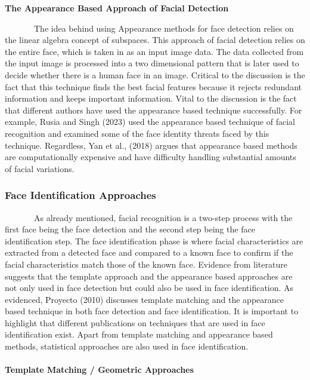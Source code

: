 \documentclass[
  12pt,
]{article}
\begin{document}
\textbf{The Appearance Based Approach of Facial Detection}\\
\vspace{-2.8em}

~~~~~~~The idea behind using Appearance methods for face detection
relies on the linear algebra concept of subspaces. This approach of
facial detection relies on the entire face, which is taken in as an
input image data. The data collected from the input image is processed
into a two dimensional pattern that is later used to decide whether
there is a human face in an image. Critical to the discussion is the
fact that this technique finds the best facial features because it
rejects redundant information and keeps important information. Vital to
the discussion is the fact that different authors have used the
appearance based technique successfully. For example, Rusia and Singh
(2023) used the appearance based technique of facial recognition and
examined some of the face identity threats faced by this technique.
Regardless, Yan et al., (2018) argues that appearance based methods are
computationally expensive and have difficulty handling substantial
amounts of facial variations.

\subsubsection{Face Identification
Approaches}\label{face-identification-approaches}

~~~~~~~As already mentioned, facial recognition is a two-step process
with the first face being the face detection and the second step being
the face identification step. The face identification phase is where
facial characteristics are extracted from a detected face and compared
to a known face to confirm if the facial characteristics match those of
the known face. Evidence from literature suggests that the template
approach and the appearance based approaches are not only used in face
detection but could also be used in face identification. As evidenced,
Proyecto (2010) discusses template matching and the appearance based
technique in both face detection and face identification. It is
important to highlight that different publications on techniques that
are used in face identification exist. Apart from template matching and
appearance based methods, statistical approaches are also used in face
identification.

\paragraph{\texorpdfstring{Template Matching / Geometric Approaches\\
}{Template Matching / Geometric Approaches }}\label{template-matching-geometric-approaches}
\end{document}

